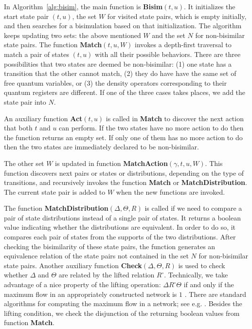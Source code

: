 \documentclass[a4paper,UKenglish,cleveref, autoref]{lipics-v2019}
\newcommand{\lift}[1]{\mathrel{{#1}^\circ}}
\begin{document}
In Algorithm~\ref{alg:bisim}, the main function is \textbf{Bisim}$(t,u)$. It initializes the start state pair $(t,u)$, the set $W$ for visited state pairs,  which is empty initially, and then searches for a bisimulation based on that initialization. 
The algorithm keeps updating two sets: the above mentioned $W$  and the set $N$ for non-bisimilar state pairs. The function \textbf{Match}$(t,u,W)$ invokes a depth-first traversal to match a pair of 
states $(t,u)$ with all their possible behaviors. There are three possibilities that two states are deemed be non-bisimilar:  (1) one state has a transition that the other cannot match, (2) they do have have the same set of free quantum variables, or (3) the density operators corresponding to their quantum registers are different. If one of the three cases takes places, we add the state pair into $N$. 

An auxiliary function \textbf{Act}$(t,u)$ is called in \textbf{Match} to discover the next action that both $t$ and $u$ can perform. If the two states have no more action to do then the function returns an empty set. If only one of them has no more action to do then the two states are immediately declared to be non-bisimilar. 

The other set $W$ is updated in function \textbf{MatchAction}$(\gamma,t,u,W)$. This function discovers next pairs or states or distributions, depending on the type of transitions,  and recursively invokes the function \textbf{Match} or \textbf{MatchDistribution}. The current state pair is added to $W$ when the new functions are invoked.



The function \textbf{MatchDistribution}$(\Delta,\Theta,\textit{R})$ is called if we need to compare a pair of state distributions instead of a single pair of states. It returns a boolean value indicating whether the distributions are equivalent. In order to do so, it compares each pair of states from the supports of the two distributions. After checking the bisimilarity of these state pairs, the function generates an equivalence relation of the state pairs not contained in the set $N$ for non-bisimilar state pairs. Another auxiliary function \textbf{Check}$(\Delta,\Theta,\textit{R})$ is used to check whether $\Delta$ and $\Theta$ are related by the lifted relation $\lift{R}$. Technically, we take advantage of a nice property of the lifting operation: $\Delta\lift{R}\Theta$ if and only if the maximum flow in an appropriately constructed network is $1$ \cite{BEM00, Deng15}. There are standard algorithms for computing the maximum flow in a network; see e.g. \cite{CHM90}.
Besides the lifting condition, we check the disjunction of the returning boolean values from function \textbf{Match}. 
\end{document}
